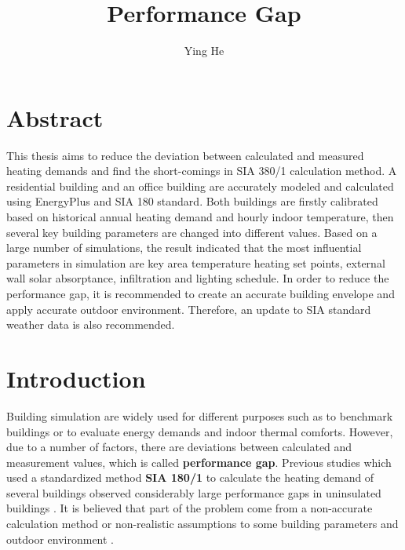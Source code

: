 \documentclass[11pt, a4paper]{article}
\title{Performance Gap}
\author{Ying He}
\theoremstyle{definition}
\newcommand{\matx}[4]{\begin{pmatrix} #1 & #2 \\ #3 & #4 \end{pmatrix}}
\newcommand{\hlor}{\colorbox{Apricot}} %
\begin{document}

\maketitle

\newpage
\tableofcontents

\newpage
\section{Abstract}
This thesis aims to reduce the deviation between calculated and measured heating demands and find the short-comings in SIA 380/1 calculation method. A residential building and an office building are accurately modeled and calculated using EnergyPlus and SIA 180 standard. Both buildings are firstly calibrated based on historical annual heating demand and hourly indoor temperature, then several key building parameters are changed into different values. Based on a large number of simulations, the result indicated that the most influential parameters in simulation are key area temperature heating set points, external wall solar absorptance, infiltration and lighting schedule. In order to reduce the performance gap, it is recommended to create an accurate building envelope and apply accurate outdoor environment. Therefore, an update to SIA standard weather data is also recommended.
\cite{FREI2017421}

\newpage
\section{Introduction}
	
		Building simulation are widely used for different purposes such as to benchmark buildings or to evaluate energy demands and indoor thermal comforts. However, due to a number of factors, there are deviations between calculated  and measurement values, which is called \textbf{performance gap}. Previous studies which used a standardized method \textbf{SIA 180/1} to calculate the heating demand of several buildings observed considerably large performance gaps in uninsulated buildings \cite{SIAPreviousreport}. It is believed that part of the problem come from a non-accurate calculation method or non-realistic assumptions to some building parameters and outdoor environment \cite{SIAPreviousreport}. \\
	
\end{document}
